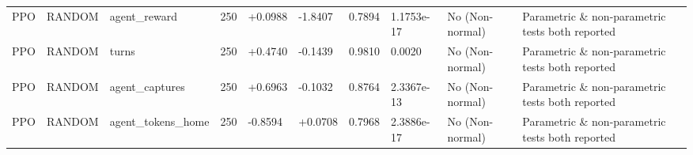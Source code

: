 \begin{table}
\begin{tabular}{llllllllll}
PPO & RANDOM & agent\_reward & 250 & +0.0988 & -1.8407 & 0.7894 & 1.1753e-17 & No (Non-normal) & Parametric \& non-parametric tests both reported \\
PPO & RANDOM & turns & 250 & +0.4740 & -0.1439 & 0.9810 & 0.0020 & No (Non-normal) & Parametric \& non-parametric tests both reported \\
PPO & RANDOM & agent\_captures & 250 & +0.6963 & -0.1032 & 0.8764 & 2.3367e-13 & No (Non-normal) & Parametric \& non-parametric tests both reported \\
PPO & RANDOM & agent\_tokens\_home & 250 & -0.8594 & +0.0708 & 0.7968 & 2.3886e-17 & No (Non-normal) & Parametric \& non-parametric tests both reported \\
\bottomrule
\end{tabular}
\end{table}

